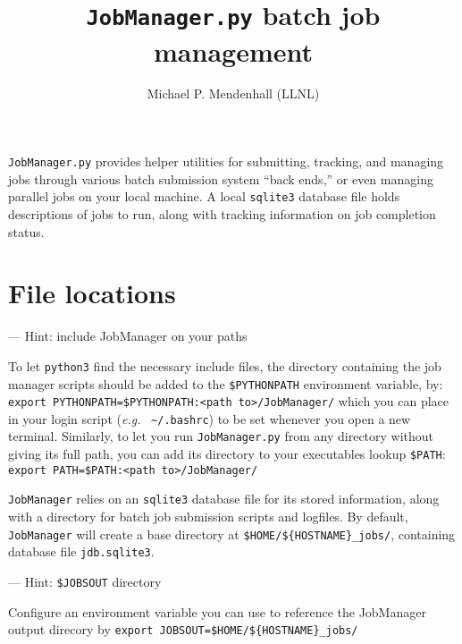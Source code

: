 \documentclass[12pt,english]{article}
\newenvironment{hint}[1][{}]{
\definecolor{shadecolor}{rgb}{.9,.9,.9}
\begin{shaded}
{\color{purple}--- Hint: #1}

}{\end{shaded}}
\newcommand{\cd}[1]{\texorpdfstring{{\color{blue} \texttt{#1}}}{#1}}
\newcommand{\eg}{{\em e.g.}}
\newcommand{\tld}{\textasciitilde}
\begin{document}
\title{\cd{JobManager.py} batch job management}
\author{Michael P. Mendenhall (LLNL)}
\maketitle

\cd{JobManager.py} provides helper utilities for submitting, tracking,
    and managing jobs through various batch submission system ``back ends,''
    or even managing parallel jobs on your local machine.
A local \cd{sqlite3} database file holds descriptions of jobs to run,
    along with tracking information on job completion status.

\tableofcontents

\section{File locations}

\begin{hint}[include JobManager on your paths]
To let \cd{python3} find the necessary include files,
    the directory containing the job manager scripts should be added to
    the \cd{\$PYTHONPATH} environment variable, by: \newline
\cd{export PYTHONPATH=\$PYTHONPATH:<path to>/JobManager/} \newline
which you can place in your login script (\eg\ \cd{\tld/.bashrc}) to be set
    whenever you open a new terminal.
Similarly, to let you run \cd{JobManager.py} from any directory without
    giving its full path, you can add its directory to your executables lookup \cd{\$PATH}: \newline
\cd{export PATH=\$PATH:<path to>/JobManager/}
\end{hint}

\cd{JobManager} relies on an \cd{sqlite3} database file for its stored information,
    along with a directory for batch job submission scripts and logfiles.
By default, \cd{JobManager} will create a base directory at \cd{\$HOME/\$\{HOSTNAME\}\_jobs/},
    containing database file \cd{jdb.sqlite3}.

\begin{hint}[\cd{\$JOBSOUT} directory]
Configure an environment variable you can use to reference the JobManager output direcory by \newline
\cd{export JOBSOUT=\$HOME/\$\{HOSTNAME\}\_jobs/}
\end{hint}
\end{document}
